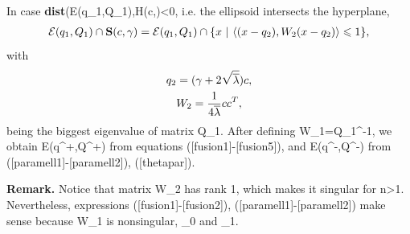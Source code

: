 \documentclass[letterpaper,10pt,english]{sphinxmanual}
\begin{document}
In case {\bf dist}({\mathcal E}(q_1,Q_1),H(c,\gamma)<0, i.e. the
ellipsoid intersects the hyperplane,
\begin{gather}
\begin{split}{\mathcal E}(q_1,Q_1)\cap{\bf S}(c,\gamma) =
{\mathcal E}(q_1,Q_1)\cap\{x ~|~ \langle (x-q_2),W_2(x-q_2)\rangle\leqslant1\},\end{split}\notag
\end{gather}
with
\begin{gather}
\begin{split}q_2  =  (\gamma + 2\sqrt{\overline{\lambda}})c,\label{hsell1} \\\end{split}\notag\\\begin{split}W_2  =  \frac{1}{4\overline{\lambda}}cc^T,\label{hsell2}\end{split}\notag
\end{gather}
\overline{\lambda} being the biggest eigenvalue of matrix
Q_1. After defining W_1=Q_1^{-1}, we obtain
{\mathcal E}(q^+,Q^+) from equations ({[}fusion1{]}-{[}fusion5{]}), and
{\mathcal E}(q^-,Q^-) from ({[}paramell1{]}-{[}paramell2{]}),
({[}thetapar{]}).

\textbf{Remark.} Notice that matrix W_2 has rank 1, which
makes it singular for n>1. Nevertheless, expressions
({[}fusion1{]}-{[}fusion2{]}), ({[}paramell1{]}-{[}paramell2{]}) make sense because
W_1 is nonsingular, \pi_0 and
\hat{\theta}_1.
\end{document}
